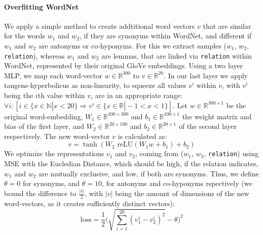 \paragraph*{Overfitting WordNet}
We apply a simple method to create addtitional word vectors $v$ that are similar for the words $w_1$ and $w_2$, if they are synonyms within WordNet, and different if $w_1$ and $w_2$ are antonyms or co-hyponyms. For this we extract samples ($w_1$, $w_2$, \texttt{relation}), whereas $w_1$ and $w_2$ are lemmas, that are linked via \texttt{relation} within WordNet, represented by their original GloVe embeddings. Using a two layer \ac{MLP}, we map each word-vector $w \in \mathbb{R}^{300}$ to $v \in \mathbb{R}^{20}$. In our last layer we apply tangens-hyperbolicus as non-linearity, to squeeze all values $v^i$ within $v$, with $v^i$ being the $i$th value within $v$, are in an appropriate range:  $ \forall i: [i \in \{x \in \mathbb{N} | x < 20\} \Rightarrow v^i \in \{x \in \mathbb{R} | -1 < x < 1\}]$. Let $w \in \mathbb{R}^{300 \times 1}$ be the original word-embedding, $W_1 \in \mathbb{R}^{100 \times 300}$ and $b_1 \in \mathbb{R}^{100 \times 1}$ the weight matrix and bias of the first layer, and $W_2 \in \mathbb{R}^{20 \times 100}$ and $b_2 \in \mathbb{R}^{20 \times 1}$ of the second layer respectively. The new word-vector $v$ is calculated as:
\begin{equation}
v = \tanh(W_2 \text{ reLU}(W_1w + b_1) + b_2)
\end{equation}
We optimize the representations $v_1$ and $v_2$, coming from ($w_1$, $w_2$, \texttt{relation}) using \ac{MSE} with the Eucledian Distance, which should be high, if the relation indicates, $w_1$ and $w_2$ are mutually exclusive, and low, if both are synonyms. Thus, we define $\theta=0$ for synonyms, and $\theta =10$, for antonyms and co-hyponyms rspectively (we bound the difference to $\frac{|v|}{2}$, with $|v|$ being the amount of dimensions of the new word-vectors, as it creates sufficiently distinct vectors):
\begin{equation}\label{eq:loss_embd}
\text{loss} = \frac{1}{2}\Bigg( \sqrt{\sum^{20}_{i=1}(v^i_1 - v^i_2)^2} - \theta\Bigg)^2
\end{equation}
